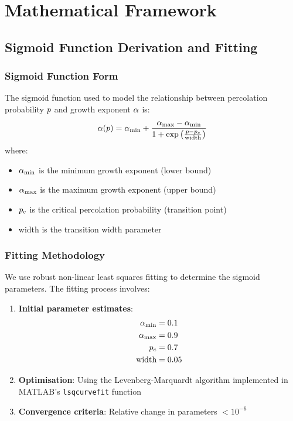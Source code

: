\appendix
\section{Mathematical Framework}
\label{app:mathematical}

\subsection{Sigmoid Function Derivation and Fitting}

\subsubsection{Sigmoid Function Form}
The sigmoid function used to model the relationship between percolation probability $p$ and growth exponent $\alpha$ is:
\begin{equation}
\alpha(p) = \alpha_{\min} + \frac{\alpha_{\max} - \alpha_{\min}}{1 + \exp\left(\frac{p - p_c}{\text{width}}\right)}
\end{equation}
where:
\begin{itemize}
    \item $\alpha_{\min}$ is the minimum growth exponent (lower bound)
    \item $\alpha_{\max}$ is the maximum growth exponent (upper bound)
    \item $p_c$ is the critical percolation probability (transition point)
    \item width is the transition width parameter
\end{itemize}

\subsubsection{Fitting Methodology}
We use robust non-linear least squares fitting to determine the sigmoid parameters. The fitting process involves:

\begin{enumerate}
    \item \textbf{Initial parameter estimates}:
    \begin{align}
    \alpha_{\min} &= 0.1 \\
    \alpha_{\max} &= 0.9 \\
    p_c &= 0.7 \\
    \text{width} &= 0.05
    \end{align}
    
    \item \textbf{Optimisation}: Using the Levenberg-Marquardt algorithm implemented in MATLAB's \texttt{lsqcurvefit} function
    
    \item \textbf{Convergence criteria}: Relative change in parameters $< 10^{-6}$
\end{enumerate}

